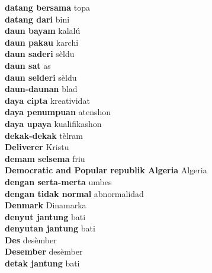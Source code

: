 \textbf{ datang bersama  } topa \\
\textbf{ datang dari  } bini \\
\textbf{ daun bayam  } kalalú \\
\textbf{ daun pakau  } karchi \\
\textbf{ daun saderi  } sèldu \\
\textbf{ daun sat  } as \\
\textbf{ daun selderi  } sèldu \\
\textbf{ daun-daunan  } blad \\
\textbf{ daya cipta  } kreatividat \\
\textbf{ daya penumpuan  } atenshon \\
\textbf{ daya upaya  } kualifikashon \\
\textbf{ dekak-dekak  } tèlram \\
\textbf{ Deliverer  } Kristu \\
\textbf{ demam selsema  } friu \\
\textbf{ Democratic and Popular republik Algeria  } Algeria \\
\textbf{ dengan serta-merta  } umbes \\
\textbf{ dengan tidak normal  } abnormalidad \\
\textbf{ Denmark  } Dinamarka \\
\textbf{ denyut jantung  } bati \\
\textbf{ denyutan jantung  } bati \\
\textbf{ Des  } desèmber \\
\textbf{ Desember  } desèmber \\
\textbf{ detak jantung  } bati \\

